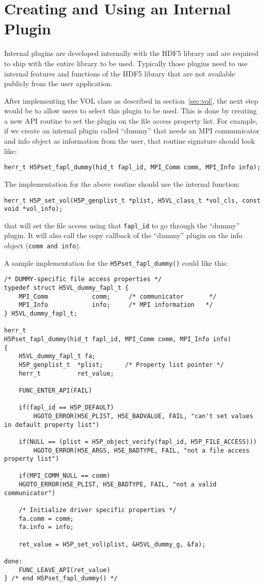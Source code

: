 \section{Creating and Using an Internal Plugin}
Internal plugins are developed internally with the HDF5 library and
are required to ship with the entire library to be used. Typically
those plugins need to use internal features and functions of the HDF5
library that are not available publicly from the user application.

After implementing the VOL class as described in
section~\ref{sec:vol}, the next step would be to allow users to select
this plugin to be used. This is done by creating a new API routine to
set the plugin on the file access property list. For example, if we
create an internal plugin called ``dummy'' that needs an MPI
communicator and info object as information from the user, that
routine signature should look like:

\begin{lstlisting}
herr_t H5Pset_fapl_dummy(hid_t fapl_id, MPI_Comm comm, MPI_Info info);
\end{lstlisting}

The implementation for the above routine should use the internal
function:
\begin{lstlisting}
herr_t H5P_set_vol(H5P_genplist_t *plist, H5VL_class_t *vol_cls, const
void *vol_info);
\end{lstlisting}
that will set the file access using that {\tt fapl\_id} to go through
the ``dummy'' plugin. It will also call the copy callback of the
``dummy'' plugin on the info object ({\tt comm and info}).

A sample implementation for the {\tt H5Pset\_fapl\_dummy()} could like
this:

\begin{lstlisting}
/* DUMMY-specific file access properties */
typedef struct H5VL_dummy_fapl_t {
    MPI_Comm            comm;     /* communicator       */
    MPI_Info            info;     /* MPI information   */
} H5VL_dummy_fapl_t;

herr_t
H5Pset_fapl_dummy(hid_t fapl_id, MPI_Comm comm, MPI_Info info)
{
    H5VL_dummy_fapl_t fa;
    H5P_genplist_t  *plist;      /* Property list pointer */
    herr_t          ret_value;

    FUNC_ENTER_API(FAIL)

    if(fapl_id == H5P_DEFAULT)
        HGOTO_ERROR(H5E_PLIST, H5E_BADVALUE, FAIL, "can't set values in default property list")

    if(NULL == (plist = H5P_object_verify(fapl_id, H5P_FILE_ACCESS)))
        HGOTO_ERROR(H5E_ARGS, H5E_BADTYPE, FAIL, "not a file access property list")

    if(MPI_COMM_NULL == comm)
	HGOTO_ERROR(H5E_PLIST, H5E_BADTYPE, FAIL, "not a valid communicator")

    /* Initialize driver specific properties */
    fa.comm = comm;
    fa.info = info;

    ret_value = H5P_set_vol(plist, &H5VL_dummy_g, &fa);

done:
    FUNC_LEAVE_API(ret_value)
} /* end H5Pset_fapl_dummy() */
\end{lstlisting}

